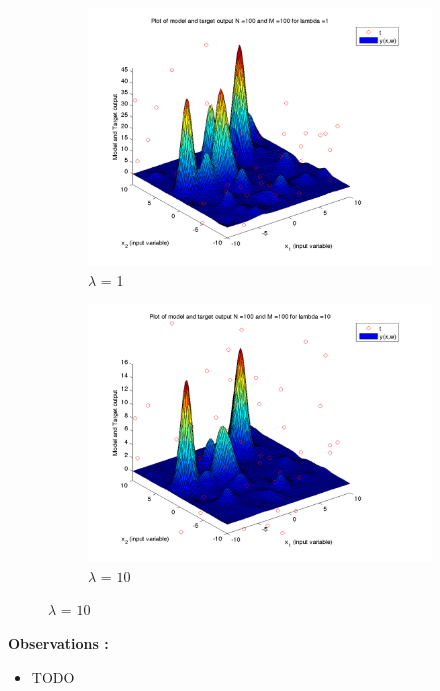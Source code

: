 \documentclass{article}
\begin{document}
\begin{figure}[H]
\begin{subfigure}{.5\textwidth}
\centering
\includegraphics[width=\linewidth]{D2/Varyinglambda_N100M100lambda1}
\caption{$\lambda$ = 1}
\end{subfigure}
\begin{subfigure}{.5\textwidth}
\includegraphics[width=\linewidth]{D2/Varyinglambda_N100M100lambda10}
\caption{$\lambda$ = $10$}
\end{subfigure}



\end{figure}


\textbf{Observations :}

\begin{itemize}
\item TODO
\end{itemize}
\end{document}
